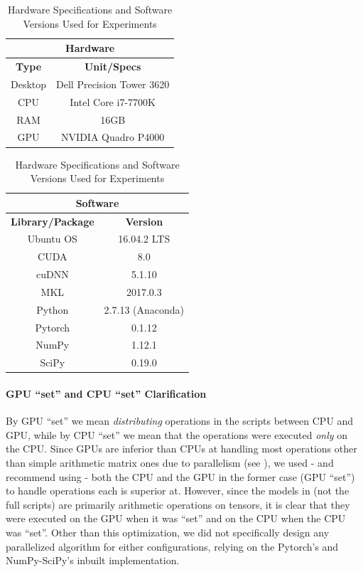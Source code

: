 \documentclass[12pt]{article}
\begin{document}
    \begin{table}[!htbp]
        \centering
        \caption{Hardware Specifications and Software Versions Used for Experiments}
        \label{tab:Hardware Specifications and Software Versions Used for Experiments}
        \begin{tabular}{|c|c|}
            \hline
            \multicolumn{2}{c}{\textbf{Hardware}}\\
            \hline
            \textbf{Type} & \textbf{Unit/Specs}\\
            \hline
            Desktop & Dell Precision Tower 3620\\
            CPU & Intel Core i7-7700K\\
            RAM & 16GB\\
            GPU & NVIDIA Quadro P4000\\
            \hline
        \end{tabular}\quad
        \begin{tabular}{|c|c|}
            \hline
            \multicolumn{2}{c}{\textbf{Software}}\\
            \hline
            \textbf{Library/Package} & \textbf{Version}\\
            \hline
            Ubuntu OS & 16.04.2 LTS\\
            CUDA & 8.0\\
            cuDNN & 5.1.10\\
            MKL & 2017.0.3\\
            Python & 2.7.13 (Anaconda)\\
            Pytorch & 0.1.12\textunderscore2\\
            NumPy & 1.12.1\\
            SciPy & 0.19.0\\
            \hline
        \end{tabular}
    \end{table}
    
    \paragraph{GPU ``set'' and CPU ``set'' Clarification} By GPU ``set'' we mean \textit{distributing} operations in the scripts between CPU and GPU, while by CPU ``set'' we mean that the operations were executed \textit{only} on the CPU. Since GPUs are inferior than CPUs at handling most operations other than simple arithmetic matrix ones due to parallelism (see ), we used - and recommend using - both the CPU and the GPU in the former case (GPU ``set'') to handle operations each is superior at. However, since the models in  (not the full scripts) are primarily arithmetic operations on  tensors, it is clear that they were executed on the GPU when it was ``set'' and on the CPU when the CPU was ``set''. Other than this optimization, we did not specifically design any parallelized algorithm for either configurations, relying on the Pytorch's and NumPy-SciPy's inbuilt implementation.
    
\end{document}

